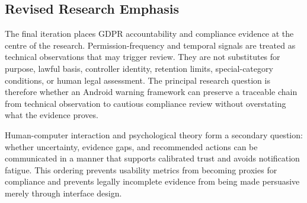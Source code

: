 
\subsection{Revised Research Emphasis}

The final iteration places GDPR accountability and compliance evidence at the centre of the research. Permission-frequency and temporal signals are treated as technical observations that may trigger review. They are not substitutes for purpose, lawful basis, controller identity, retention limits, special-category conditions, or human legal assessment. The principal research question is therefore whether an Android warning framework can preserve a traceable chain from technical observation to cautious compliance review without overstating what the evidence proves.

Human-computer interaction and psychological theory form a secondary question: whether uncertainty, evidence gaps, and recommended actions can be communicated in a manner that supports calibrated trust and avoids notification fatigue. This ordering prevents usability metrics from becoming proxies for compliance and prevents legally incomplete evidence from being made persuasive merely through interface design.

